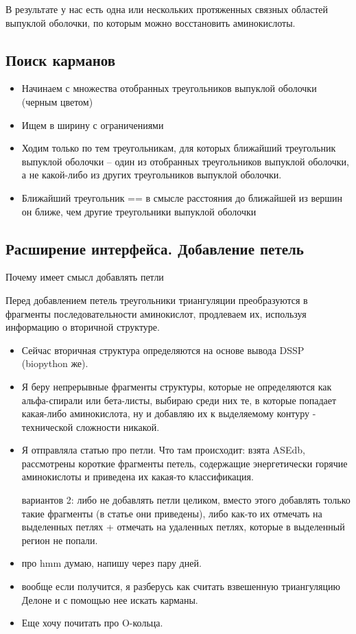 В результате у нас есть одна или нескольких протяженных связных областей выпуклой оболочки, по которым можно восстановить аминокислоты.
\subsection{Поиск карманов}
\begin{itemize}
\item Начинаем с множества отобранных треугольников выпуклой оболочки (черным цветом)
\item Ищем в ширину с ограничениями
\item Ходим только по тем треугольникам, для которых ближайший треугольник выпуклой оболочки -- один из отобранных треугольников выпуклой оболочки, а не какой-либо из других треугольников выпуклой оболочки.
\item Ближайший треугольник == в смысле расстояния до ближайшей из вершин он ближе, чем другие треугольники выпуклой оболочки
\end{itemize}
\subsection{Расширение интерфейса. Добавление петель}
Почему имеет смысл добавлять петли

Перед добавлением петель треугольники триангуляции преобразуются в фрагменты последовательности аминокислот, продлеваем их, используя информацию о вторичной структуре.


\begin{itemize}
\item Сейчас вторичная структура определяются на основе вывода DSSP (biopython же).

\item Я беру непрерывные фрагменты структуры, которые не определяются как альфа-спирали или бета-листы, выбираю среди них те, в которые попадает какая-либо аминокислота, ну и добавляю их к выделяемому контуру - технической сложности никакой.

\end{itemize}


\begin{itemize}
\item Я отправляла статью про петли. Что там происходит: взята ASEdb, рассмотрены короткие фрагменты петель, содержащие энергетически горячие аминокислоты и приведена их какая-то классификация.

вариантов 2: либо не добавлять петли целиком, вместо этого добавлять только такие фрагменты (в статье они приведены), либо как-то их отмечать на выделенных петлях + отмечать на удаленных петлях, которые в выделенный регион не попали.

\item про hmm думаю, напишу через пару дней.

\item вообще если получится, я разберусь как считать взвешенную триангуляцию Делоне и с помощью нее искать карманы.

\item Еще хочу почитать про O-кольца.

\end{itemize}
